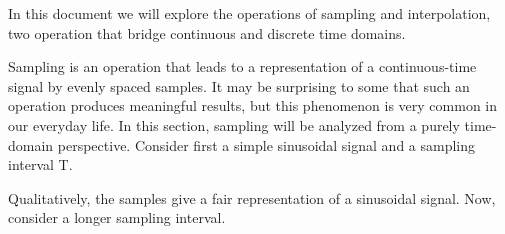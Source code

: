 \documentclass{article}
\begin{document}
\begin{CellGroup}


In this document we will explore the operations of sampling and interpolation, two operation that bridge continuous and discrete time domains. 


\end{CellGroup}
\begin{CellGroup}


Sampling is an operation that leads to a representation of a continuous-time signal by evenly spaced samples. It may be surprising to some that such
an operation produces meaningful results, but this phenomenon is very common in our everyday life. In this section, sampling will be analyzed from
a purely time-domain perspective. Consider first a simple sinusoidal signal and a sampling interval T.

\begin{CellGroup}

\end{CellGroup}
\begin{CellGroup}

\end{CellGroup}
Qualitatively, the samples give a fair representation of a sinusoidal signal. Now, consider a longer sampling interval. 


\end{CellGroup}
\end{document}
